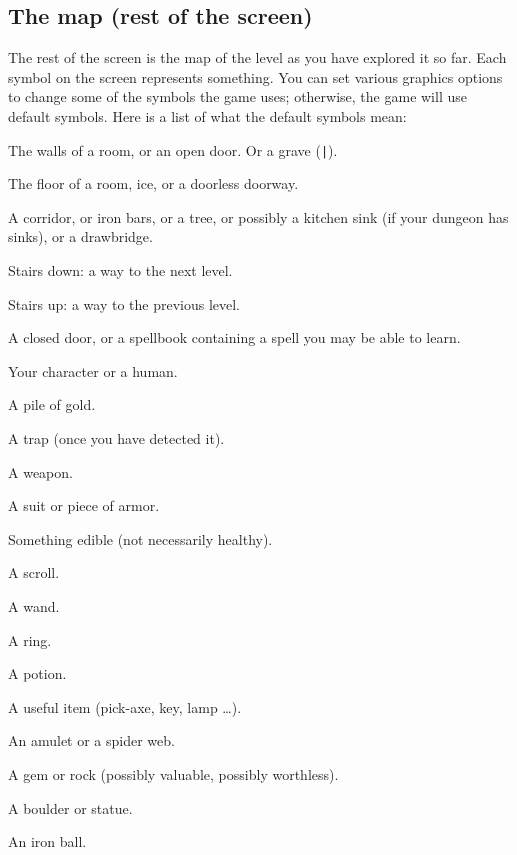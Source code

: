 \subsection*{The map (rest of the screen)}

The rest of the screen is the map of the level as you have explored it
so far.  Each symbol on the screen represents something.  You can set
various graphics
options to change some of the symbols the game uses; otherwise, the
game will use default symbols.  Here is a list of what the default
symbols mean:

\blist{}
\item[\tb{- {\rm and} |}]
The walls of a room, or an open door.  Or a grave ({\tt |}).
\item[\tb{.}]
The floor of a room, ice, or a doorless doorway.
\item[\tb{\#}]
A corridor, or iron bars, or a tree, or possibly a kitchen sink (if
your dungeon has sinks), or a drawbridge.
\item[\tb{>}]
Stairs down: a way to the next level.
\item[\tb{<}]
Stairs up: a way to the previous level.
\item[\tb{+}]
A closed door, or a spellbook containing a spell you may be able to learn.
\item[\tb{@}]
Your character or a human.
\item[\tb{\$}]
A pile of gold.
\item[\tb{\^}]
A trap (once you have detected it).
\item[\tb{)}]
A weapon.
\item[\tb{[}]
A suit or piece of armor.
\item[\tb{\%}]
Something edible (not necessarily healthy).
\item[\tb{?}]
A scroll.
\item[\tb{/}]
A wand.
\item[\tb{=}]
A ring.
\item[\tb{!}]
A potion.
\item[\tb{(}]
A useful item (pick-axe, key, lamp \ldots).
\item[\tb{"}]
An amulet or a spider web.
\item[\tb{*}]
A gem or rock (possibly valuable, possibly worthless).
\item[\tb{`}]
A boulder or statue.
\item[\tb{0}]
An iron ball.
